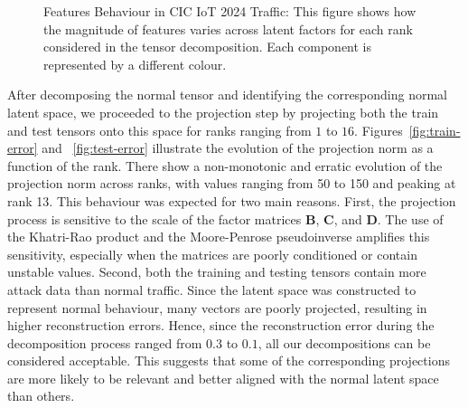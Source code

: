 \documentclass[pdflatex,sn-mathphys-num]{sn-jnl}
\theoremstyle{thmstyleone}
\theoremstyle{thmstyletwo}
\theoremstyle{thmstylethree}
\begin{document}
\begin{figure}[H]
\caption{Features Behaviour in CIC IoT 2024 Traffic: This figure shows how the magnitude of features varies across latent factors for each rank considered in the tensor decomposition. Each component is represented by a different colour.}
\label{fig:ranks_evolution}
\end{figure}


\noindent After decomposing the normal tensor and identifying the corresponding normal latent space, we proceeded to the projection step by projecting both the train and test tensors onto this space for ranks ranging from $1$ to $16$. Figures~\ref{fig:train-error} and ~\ref{fig:test-error} illustrate the evolution of the projection norm as a function of the rank. There show a non-monotonic and erratic evolution of the projection norm across ranks, with values ranging from 50 to 150 and peaking at rank 13. This behaviour was expected for two main reasons. First, the projection process is sensitive to the scale of the factor matrices $\mathbf{B}$, $\mathbf{C}$, and $\mathbf{D}$. The use of the Khatri-Rao product and the Moore-Penrose pseudoinverse amplifies this sensitivity, especially when the matrices are poorly conditioned or contain unstable values. Second, both the training and testing tensors contain more attack data than normal traffic. Since the latent space was constructed to represent normal behaviour, many vectors are poorly projected, resulting in higher reconstruction errors. Hence, since the reconstruction error during the decomposition process ranged from $0.3$ to $0.1$, all our decompositions can be considered acceptable. This suggests that some of the corresponding projections are more likely to be relevant and better aligned with the normal latent space than others.
\end{document}
